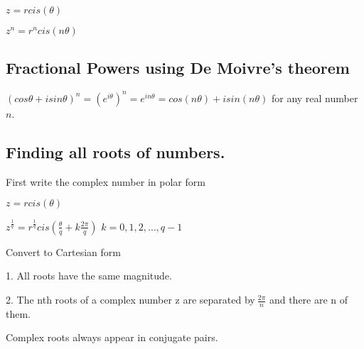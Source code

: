 \documentclass{extarticle}
\begin{document}
$z=rcis\left(\theta\right)$

$z^n=r^ncis\left(n\theta\right)$


\subsection{Fractional Powers using De Moivre's theorem}

$\left(cos\theta+isin\theta\right)^n=\left(e^{i\theta}\right)^n=e^{in\theta}=cos\left(n\theta\right)+isin\left(n\theta\right)$
for any real number $n$.


\subsection{Finding all roots of numbers.}

First write the complex number in polar form

$z=rcis\left(\theta\right)$


$z^\frac{1}{q}=r^\frac{1}{q}cis\left(\frac{\theta}{q}+k\frac{2\pi}{q}\right)$ $k=0,1,2,\ldots,q-1$

Convert to Cartesian form

1. All roots have the same magnitude.

2. The nth roots of a complex number z are separated by$\ \frac{2\pi}{n}$ and there are n of them.

Complex roots always appear in conjugate pairs.
\end{document}
